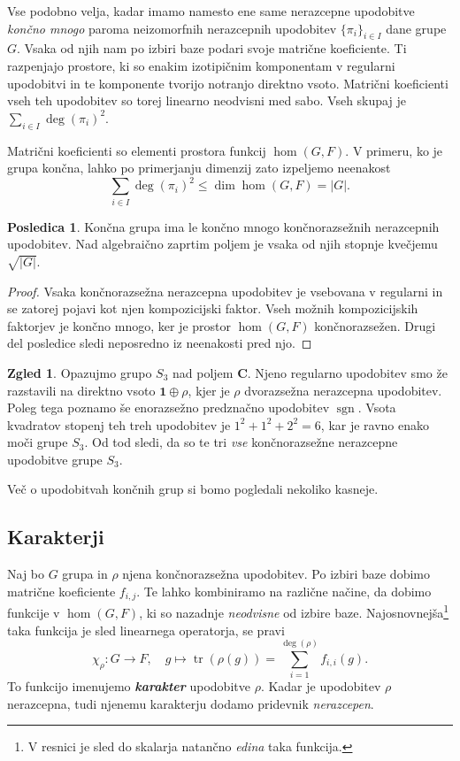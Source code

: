 \documentclass[11pt]{book}
\def\CC{\mathbf{C}}
\def\11{\mathbf{1}}
\DeclareMathOperator\sgn{sgn}
\DeclareMathOperator\tr{tr}
\def\definicija{\color{rdeca}\bf\em}
\theoremstyle{definition}
\theoremstyle{zgled}
\newtheorem*{zgled}{Zgled}
\theoremstyle{odprtproblem}
\theoremstyle{domacanaloga}
\newenvironment{dokaz}
    {\color{siva}\begin{proof}}
    {\end{proof}}
\theoremstyle{izrek}
\newtheorem*{posledica}{Posledica}
\begin{document}
Vse podobno velja, kadar imamo namesto ene same nerazcepne upodobitve \emph{končno mnogo} paroma neizomorfnih nerazcepnih upodobitev $\{ \pi_i \}_{i \in I}$ dane grupe $G$. Vsaka od njih nam po izbiri baze podari svoje matrične koeficiente. Ti razpenjajo prostore, ki so enakim izotipičnim komponentam v regularni upodobitvi in te komponente tvorijo notranjo direktno vsoto. Matrični koeficienti vseh teh upodobitev so torej linearno neodvisni med sabo. Vseh skupaj je $\sum_{i \in I} \deg(\pi_i)^2$. 

Matrični koeficienti so elementi prostora funkcij $\hom(G,F)$. V primeru, ko je grupa končna, lahko po primerjanju dimenzij zato izpeljemo neenakost
\[
    \sum_{i \in I} \deg(\pi_i)^2 \leq \dim \hom(G,F) = |G|.
\]

\begin{posledica}
Končna grupa ima le končno mnogo končnorazsežnih nerazcepnih upodobitev. Nad algebraično zaprtim poljem je vsaka od njih stopnje kvečjemu $\sqrt{|G|}$.
\end{posledica}
\begin{dokaz}
Vsaka končnorazsežna nerazcepna upodobitev je vsebovana v regularni in se zatorej pojavi kot njen kompozicijski faktor. Vseh možnih kompozicijskih faktorjev je končno mnogo, ker je prostor $\hom(G,F)$ končnorazsežen. Drugi del posledice sledi neposredno iz neenakosti pred njo.
\end{dokaz}

\begin{zgled}
    Opazujmo grupo $S_3$ nad poljem $\CC$. Njeno regularno upodobitev smo že razstavili na direktno vsoto $\11 \oplus \rho$, kjer je $\rho$ dvorazsežna nerazcepna upodobitev. Poleg tega poznamo še enorazsežno predznačno upodobitev $\sgn$. Vsota kvadratov stopenj teh treh upodobitev je $1^2 + 1^2 + 2^2 = 6$, kar je ravno enako moči grupe $S_3$. Od tod sledi, da so te tri \emph{vse} končnorazsežne nerazcepne upodobitve grupe $S_3$.
\end{zgled}

Več o upodobitvah končnih grup si bomo pogledali nekoliko kasneje.

\subsection{Karakterji}

Naj bo $G$ grupa in $\rho$ njena končnorazsežna upodobitev. Po izbiri baze dobimo matrične koeficiente $f_{i,j}$. Te lahko kombiniramo na različne načine, da dobimo funkcije v $\hom(G,F)$, ki so nazadnje \emph{neodvisne} od izbire baze. Najosnovnejša\footnote{V resnici je sled do skalarja natančno \emph{edina} taka funkcija.} taka funkcija je sled linearnega operatorja, se pravi
\[
    \textstyle \chi_{\rho} \colon G \to F, \quad
    g \mapsto \tr(\rho(g)) = \sum_{i = 1}^{\deg(\rho)} f_{i,i}(g).
\]
To funkcijo imenujemo {\definicija karakter} upodobitve $\rho$. Kadar je upodobitev $\rho$ nerazcepna, tudi njenemu karakterju dodamo pridevnik \emph{nerazcepen}. 
\end{document}
